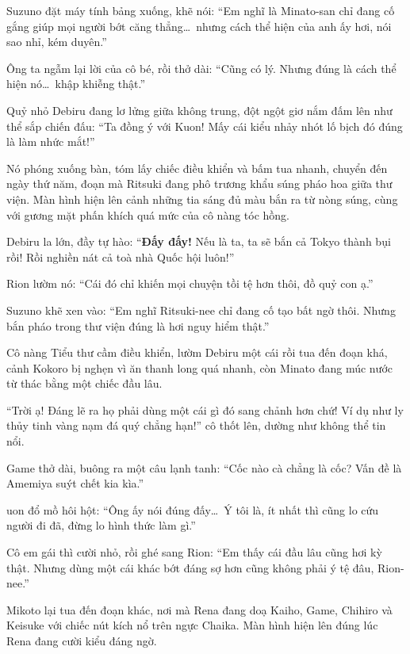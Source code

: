 \documentclass[../main.tex]{subfiles}
\begin{document}
Suzuno đặt máy tính bảng xuống, khẽ nói: ``Em nghĩ là Minato-san chỉ đang cố gắng giúp mọi người bớt căng thẳng\dots\ nhưng cách thể hiện của anh ấy hơi, nói sao nhỉ, kém duyên.''

Ông ta ngẫm lại lời của cô bé, rồi thở dài: ``Cũng có lý. Nhưng đúng là cách thể hiện nó\dots\ khập khiễng thật.''

Quỷ nhỏ Debiru đang lơ lửng giữa không trung, đột ngột giơ nắm đấm lên như thể sắp chiến đấu: ``Ta đồng ý với Kuon! Mấy cái kiểu nhảy nhót lố bịch đó đúng là làm nhức mắt!''

Nó phóng xuống bàn, tóm lấy chiếc điều khiển và bấm tua nhanh, chuyển đến ngày thứ năm, đoạn mà Ritsuki đang phô trương khẩu súng pháo hoa giữa thư viện. Màn hình hiện lên cảnh những tia sáng đủ màu bắn ra từ nòng súng, cùng với gương mặt phấn khích quá mức của cô nàng tóc hồng.

Debiru la lớn, đầy tự hào: ``\textbf{Đấy đấy!} Nếu là ta, ta sẽ bắn cả Tokyo thành bụi rồi! Rồi nghiền nát cả toà nhà Quốc hội luôn!''


Rion lườm nó: ``Cái đó chỉ khiến mọi chuyện tồi tệ hơn thôi, đồ quỷ con ạ.''

Suzuno khẽ xen vào: ``Em nghĩ Ritsuki-nee chỉ đang cố tạo bất ngờ thôi. Nhưng bắn pháo trong thư viện đúng là hơi nguy hiểm thật.''

Cô nàng Tiểu thư cầm điều khiển, lườm Debiru một cái rồi tua đến đoạn khá, cảnh Kokoro bị nghẹn vì ăn thanh long quá nhanh, còn Minato đang múc nước từ thác bằng một chiếc đầu lâu.


``Trời ạ! Đáng lẽ ra họ phải dùng một cái gì đó sang chảnh hơn chứ! Ví dụ như ly thủy tinh vàng nạm đá quý chẳng hạn!'' cô thốt lên, dường như không thể tin nổi.

Game thở dài, buông ra một câu lạnh tanh: ``Cốc nào cà chẳng là cốc? Vấn đề là Amemiya suýt chết kia kìa.''

uon đổ mồ hôi hột: ``Ông ấy nói đúng đấy\dots\ Ý tôi là, ít nhất thì cũng lo cứu người đi đã, đừng lo hình thức làm gì.''

Cô em gái thì cười nhỏ, rồi ghé sang Rion: ``Em thấy cái đầu lâu cũng hơi kỳ thật. Nhưng dùng một cái khác bớt đáng sợ hơn cũng không phải ý tệ đâu, Rion-nee.''

Mikoto lại tua đến đoạn khác, nơi mà Rena đang doạ Kaiho, Game, Chihiro và Keisuke với chiếc nút kích nổ trên ngực Chaika. Màn hình hiện lên đúng lúc Rena đang cười kiểu đáng ngờ.
\end{document}
